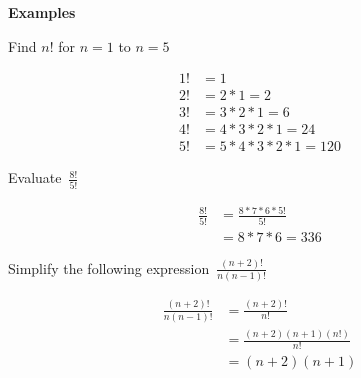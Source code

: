 \documentclass[addpoints]{exam}
\begin{document}
\vspace{0.2in}
\Large\textbf{Examples}\normalsize
\begin{questions}
	\question Find $n\textbf{!}$ for $n=1$ to $n=5$
	\begin{solution}[\stretch{1}]
		\begin{align*}
			1\textbf{!} & = 1                       \\
			2\textbf{!} & = 2 * 1 = 2               \\
			3\textbf{!} & = 3 * 2 * 1 = 6           \\
			4\textbf{!} & = 4 * 3 * 2 * 1 = 24      \\
			5\textbf{!} & = 5 * 4 * 3 * 2 * 1 = 120
		\end{align*}
	\end{solution}

	\question Evaluate $\displaystyle\,\frac{8\textbf{!}}{5\textbf{!}}$
	\begin{solution}[\stretch{1}]
		\begin{align*}
			\frac{8\textbf{!}}{5\textbf{!}} & = \frac{8 * 7 * 6 * 5\textbf{!}}{5\textbf{!}} \\
			                                & = 8 * 7 * 6 = 336
		\end{align*}
	\end{solution}

	\question Simplify the following expression $\displaystyle\,\frac{\left(n+2\right)\textbf{!}}{n\left(n-1\right)\textbf{!}}$
	\begin{solution}[\stretch{1}]
		\begin{align*}
			\frac{\left(n+2\right)\textbf{!}}{n\left(n-1\right)\textbf{!}} & = \frac{\left(n+2\right)\textbf{!}}{n\textbf{!}}                               \\
			                                                               & = \frac{\left(n+2\right)\left(n+1\right)\left(n\textbf{!}\right)}{n\textbf{!}} \\
			                                                               & = \left(n+2\right)\left(n+1\right)
		\end{align*}
	\end{solution}
\end{questions}
\end{document}
